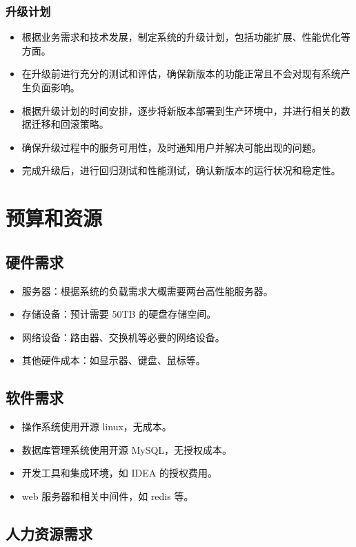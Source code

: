 \documentclass{article}
\begin{document}
\subsubsection{升级计划}
\begin{itemize}
	\item 根据业务需求和技术发展，制定系统的升级计划，包括功能扩展、性能优化等方面。
	\item 在升级前进行充分的测试和评估，确保新版本的功能正常且不会对现有系统产生负面影响。
	\item 根据升级计划的时间安排，逐步将新版本部署到生产环境中，并进行相关的数据迁移和回滚策略。
	\item 确保升级过程中的服务可用性，及时通知用户并解决可能出现的问题。
	\item 完成升级后，进行回归测试和性能测试，确认新版本的运行状况和稳定性。
\end{itemize}

\section{预算和资源}
\subsection{硬件需求}
\begin{itemize}
	\item 服务器：根据系统的负载需求大概需要两台高性能服务器。
	\item 存储设备：预计需要 50TB 的硬盘存储空间。
	\item 网络设备：路由器、交换机等必要的网络设备。
	\item 其他硬件成本：如显示器、键盘、鼠标等。
\end{itemize}

\subsection{软件需求}
\begin{itemize}
	\item 操作系统使用开源 linux，无成本。
	\item 数据库管理系统使用开源 MySQL，无授权成本。
	\item 开发工具和集成环境，如 IDEA 的授权费用。
	\item web 服务器和相关中间件，如 redis 等。
\end{itemize}

\subsection{人力资源需求}
\end{document}
